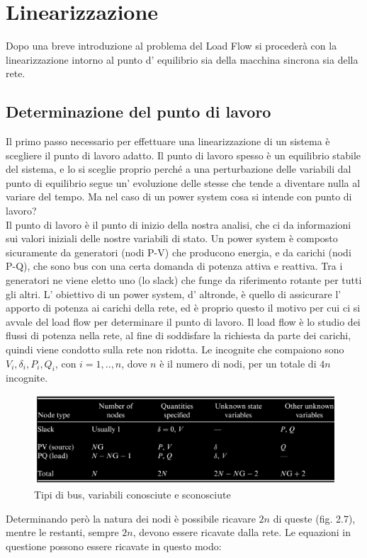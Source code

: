 \documentclass[Lau,noexaminfo]{sapthesis}
\begin{document}
	
	
	\section{Linearizzazione}
	Dopo una breve introduzione al problema del Load Flow si procederà con la linearizzazione intorno al punto d' equilibrio sia della macchina sincrona sia della rete.
	\subsection{Determinazione del punto di lavoro}
	Il primo passo necessario per effettuare una linearizzazione di un sistema è scegliere il punto di lavoro adatto. Il punto di lavoro spesso è un equilibrio stabile del sistema, e lo si sceglie proprio perché a una perturbazione delle variabili dal punto di equilibrio segue un' evoluzione delle stesse che tende a diventare nulla al variare del tempo. Ma nel caso di un power system cosa si intende con punto di lavoro?\\
	Il punto di lavoro è il punto di inizio della nostra analisi, che ci da informazioni sui valori iniziali delle nostre variabili di stato. Un power system è composto sicuramente da generatori (nodi P-V) che producono energia, e da carichi (nodi P-Q), che sono bus con una certa domanda di potenza attiva e reattiva. Tra i generatori ne viene eletto uno (lo slack) che funge da riferimento rotante per tutti gli altri. L' obiettivo di un power system, d' altronde, è quello di assicurare l' apporto di potenza ai carichi della rete, ed è proprio questo il motivo per cui ci si avvale del load flow per determinare il punto di lavoro. Il load flow è lo studio dei flussi di potenza nella rete, al fine di soddisfare la richiesta da parte dei carichi, quindi viene condotto sulla rete non ridotta. Le incognite che compaiono sono $V_i,\delta_i,P_i,Q_i$, con $i=1,..,n$, dove $n$ è il numero di nodi, per un totale di $4n$ incognite.
	\begin{figure}
		\centering
		\includegraphics[height=0.2\textheight]{tipidibus}
		\caption{Tipi di bus, variabili conosciute e sconosciute}
	\end{figure} Determinando però la natura dei nodi è possibile ricavare $2n$ di queste (fig. 2.7), mentre le restanti, sempre $2n$, devono essere ricavate dalla rete. Le equazioni in questione possono essere ricavate in questo modo:\\
\end{document}
